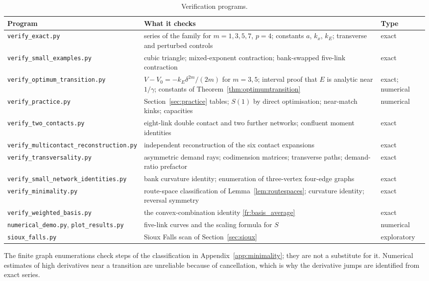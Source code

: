 \begin{table}[htbp]
\centering\small
\begin{tabularx}{\linewidth}{@{}l>{\raggedright\arraybackslash}Xl@{}}
\toprule
Program & What it checks & Type\\
\midrule
\texttt{verify\_exact.py} & series of the family for $m=1,3,5,7$, $p=4$; constants $a$, $k_x$, $k_E$; transverse and perturbed controls & exact\\
\texttt{verify\_small\_examples.py} & cubic triangle; mixed-exponent contraction; bank-swapped five-link contraction & exact\\
\texttt{verify\_optimum\_transition.py} & $V-V_0=-k_E\delta^{2m}/(2m)$ for $m=3,5$; interval proof that $E$ is analytic near $1/\gamma$; constants of Theorem~\ref{thm:optimumtransition} & exact; numerical\\
\texttt{verify\_practice.py} & Section~\ref{sec:practice} tables; $S(1)$ by direct optimisation; near-match kinks; capacities & numerical\\
\texttt{verify\_two\_contacts.py} & eight-link double contact and two further networks; confluent moment identities & exact\\
\texttt{verify\_multicontact\_reconstruction.py} & independent reconstruction of the six contact expansions & exact\\
\texttt{verify\_transversality.py} & asymmetric demand rays; codimension matrices; transverse paths; demand-ratio prefactor & exact\\
\texttt{verify\_small\_network\_identities.py} & bank curvature identity; enumeration of three-vertex four-edge graphs & exact\\
\texttt{verify\_minimality.py} & route-space classification of Lemma~\ref{lem:routespaces}; curvature identity; reversal symmetry & exact\\
\texttt{verify\_weighted\_basis.py} & the convex-combination identity \eqref{fr:basis_average} & exact\\
\texttt{numerical\_demo.py}, \texttt{plot\_results.py} & five-link curves and the scaling formula for $S$ & numerical\\
\texttt{sioux\_falls.py} & Sioux Falls scan of Section~\ref{sec:sioux} & exploratory\\
\bottomrule
\end{tabularx}
\caption{Verification programs.}
\label{tab:verifiers}
\end{table}

The finite graph enumerations check steps of the classification in Appendix~\ref{app:minimality}; they are not a substitute for it. Numerical estimates of high derivatives near a transition are unreliable because of cancellation, which is why the derivative jumps are identified from exact series.
